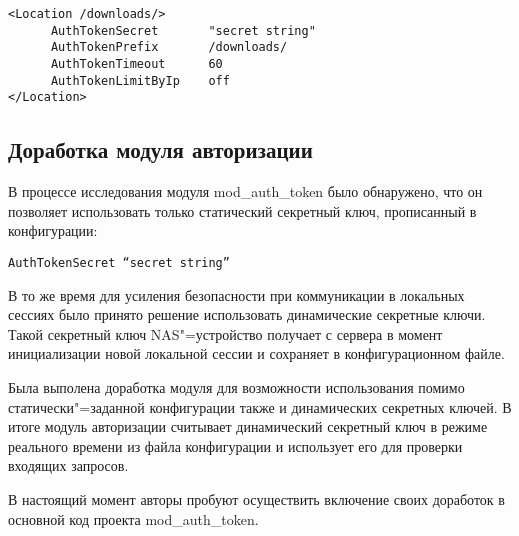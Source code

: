 \documentclass[10pt, a5paper]{article}
\begin{document}
\begin{verbatim}
<Location /downloads/>
      AuthTokenSecret       "secret string"
      AuthTokenPrefix       /downloads/
      AuthTokenTimeout      60
      AuthTokenLimitByIp    off
</Location>\end{verbatim}
\subsection*{Доработка модуля авторизации}

В процессе исследования модуля mod\_auth\_token было обнаружено, что он позволяет использовать только статический секретный ключ, прописанный в конфигурации:

\begin{verbatim}
AuthTokenSecret “secret string”\end{verbatim}
В то же время для усиления безопасности при коммуникации в локальных сессиях было принято решение использовать динамические секретные ключи. Такой секретный ключ NAS"=устройство получает с сервера в момент инициализации новой локальной сессии и сохраняет в конфигурационном файле.

Была выполена доработка модуля для возможности использования помимо статически"=заданной конфигурации также и динамических секретных ключей. В итоге модуль авторизации считывает динамический секретный ключ в режиме реального времени из файла конфигурации и использует его для проверки входящих запросов.

В настоящий момент авторы пробуют осуществить включение своих доработок в основной код проекта mod\_auth\_token.
\end{document}
